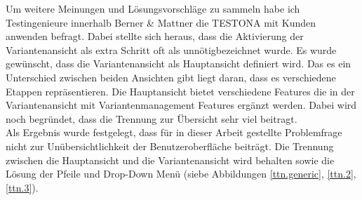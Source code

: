 Um weitere Meinungen und Lösungsvorschläge zu sammeln habe ich Testingenieure innerhalb Berner \& Mattner die TESTONA mit Kunden anwenden befragt. Dabei stellte sich heraus, dass die Aktivierung der Variantenansicht als extra Schritt oft als \glqq unnötig\grqq bezeichnet wurde. Es wurde gewünscht, dass die Variantenansicht als Hauptansicht definiert wird. Das es ein Unterschied zwischen beiden Ansichten gibt liegt daran, dass es verschiedene Etappen repräsentieren. Die Hauptansicht bietet verschiedene Features die in der Variantenansicht mit Variantenmanagement Features ergänzt werden. Dabei wird noch begründet, dass die Trennung zur Übersicht sehr viel beitragt.\\

Als Ergebnis wurde festgelegt, dass für in dieser Arbeit gestellte Problemfrage nicht zur Unübersichtlichkeit der Benutzeroberfläche beiträgt. Die Trennung zwischen die Hauptansicht und die Variantenansicht wird behalten sowie die Lösung der Pfeile und Drop-Down Menü (siebe Abbildungen \ref{ttn.generic}, \ref{ttn.2}, \ref{ttn.3}).
